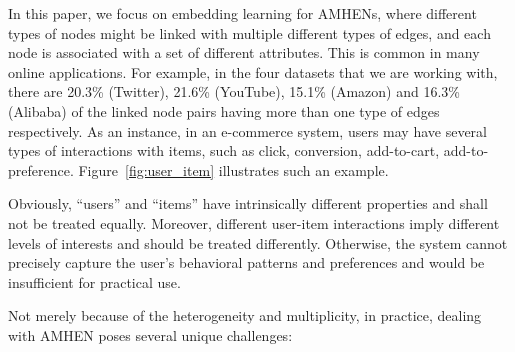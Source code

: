 \documentclass[sigconf]{acmart}
\newcommand\yang[1]{\textcolor{red}{[Hongxia: #1]}}
\newcommand{\company}{Alibaba}
\begin{document}
In this paper, we focus on embedding learning for AMHENs, where different types of nodes might be linked with multiple different types of edges, and each node is associated with a set of different attributes. This is common in many online applications. For example, in the four datasets that we are working with, there are  20.3\% (Twitter), 21.6\% (YouTube), 15.1\% (Amazon) and 16.3\% (\company) of the linked node pairs having more than one type of edges respectively. As an instance, in an e-commerce system, 
users may have several types of interactions with items, such as click, conversion, add-to-cart, add-to-preference. Figure~\ref{fig:user_item} illustrates such an example.
\iffalse
\yang{MORE STATISTICS FOR OTHER DATASETS: Statistics show that approximately 16.3\% of the linked user-item pairs have more than one type of edges.  16.3\% \company, 20.3\% Twitter, 21.6\% Youtube,15.1\% Amazon } 
\fi
Obviously, ``users'' and ``items'' have intrinsically different properties and shall not be treated equally.
Moreover, different user-item interactions imply different levels of interests and should be treated differently. Otherwise, the system cannot precisely capture the user's behavioral patterns and preferences and would be insufficient for practical use. 


Not merely because of the heterogeneity and multiplicity, in practice, dealing with  AMHEN poses several unique challenges:
\end{document}
